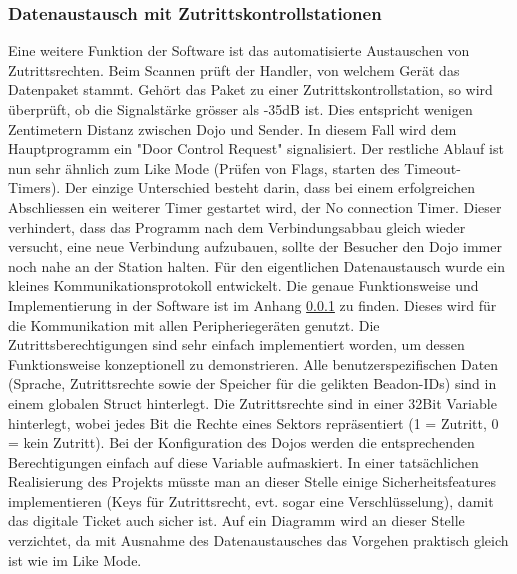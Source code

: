 \subsubsection{Datenaustausch mit Zutrittskontrollstationen}
Eine weitere Funktion der Software ist das automatisierte Austauschen von Zutrittsrechten. Beim Scannen prüft der Handler, von welchem Gerät das Datenpaket stammt. Gehört das Paket zu einer Zutrittskontrollstation, so wird überprüft, ob die Signalstärke grösser als -35dB ist. Dies entspricht wenigen Zentimetern Distanz zwischen Dojo und Sender. In diesem Fall wird dem Hauptprogramm ein "Door Control Request" signalisiert. Der restliche Ablauf ist nun sehr ähnlich zum Like Mode (Prüfen von Flags, starten des Timeout-Timers). Der einzige Unterschied besteht darin, dass bei einem erfolgreichen Abschliessen ein weiterer Timer gestartet wird, der No connection Timer. Dieser verhindert, dass das Programm nach dem Verbindungsabbau gleich wieder versucht, eine neue Verbindung aufzubauen, sollte der Besucher den Dojo immer noch nahe an der Station halten.
Für den eigentlichen Datenaustausch wurde ein kleines Kommunikationsprotokoll entwickelt. Die genaue Funktionsweise und Implementierung in der Software ist im Anhang \ref{} zu finden. Dieses wird für die Kommunikation mit allen Peripheriegeräten genutzt. 
Die Zutrittsberechtigungen sind sehr einfach implementiert worden, um dessen Funktionsweise konzeptionell zu demonstrieren. Alle benutzerspezifischen Daten (Sprache, Zutrittsrechte sowie der Speicher für die gelikten Beadon-IDs) sind in einem globalen Struct hinterlegt. Die Zutrittsrechte sind in einer 32Bit Variable hinterlegt, wobei jedes Bit die Rechte eines Sektors repräsentiert (1 = Zutritt, 0 = kein Zutritt). Bei der Konfiguration des Dojos werden die entsprechenden Berechtigungen einfach auf diese Variable aufmaskiert. In einer tatsächlichen Realisierung des Projekts müsste man an dieser Stelle einige Sicherheitsfeatures implementieren (Keys für Zutrittsrecht, evt. sogar eine Verschlüsselung), damit das digitale Ticket auch sicher ist.
Auf ein Diagramm wird an dieser Stelle verzichtet, da mit Ausnahme des Datenaustausches das Vorgehen praktisch gleich ist wie im Like Mode.
